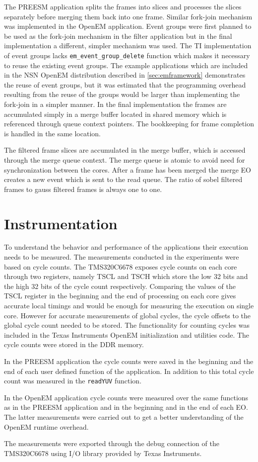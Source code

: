 The PREESM application splits the frames into slices and processes the slices
separately before merging them back into one frame. Similar fork-join mechanism
was implemented in the OpenEM application. Event groups were first planned to be
used as the fork-join mechanism in the filter application but in the final
implementation a different, simpler mechanism was used. The TI implementation of
event groups lacks \texttt{em\_event\_group\_delete} function which makes it
necessary to reuse the existing event groups. The example applications which are
included in the NSN OpenEM distribution described in \ref{sec:emframework}
demonstrates the reuse of event groups, but it was estimated that the
programming overhead resulting from the reuse of the groups would be larger than
implementing the fork-join in a simpler manner. In the final implementation the
frames are accumulated simply in a merge buffer located in shared memory which
is referenced through queue context pointers. The bookkeeping for frame
completion is handled in the same location.

The filtered frame slices are accumulated in the merge buffer, which is accessed
through the merge queue context. The merge queue is atomic to avoid need for
synchronization between the cores. After a frame has been merged the merge EO
creates a new event which is sent to the read queue. The ratio of sobel filtered
frames to gauss filtered frames is always one to one.

\section{Instrumentation}
\label{sec:instrumentation}
To understand the behavior and performance of the applications their execution
needs to be measured. The measurements conducted in the experiments were based
on cycle counts. The TMS320C6678 exposes cycle counts on each core through two
registers, namely TSCL and TSCH which store the low 32 bits and the high 32 bits
of the cycle count respectively. Comparing the values of the TSCL register in
the beginning and the end of processing on each core gives accurate local
timings and would be enough for measuring the execution on single core. However
for accurate measurements of global cycles, the cycle offsets to the global
cycle count needed to be stored. The functionality for counting cycles was
included in the Texas Instruments OpenEM initialization and utilities code. The
cycle counts were stored in the DDR memory.

In the PREESM application the cycle counts were saved in the beginning and the
end of each user defined function of the application. In addition to this total
cycle count was measured in the \texttt{readYUV} function.

In the OpenEM application cycle counts were measured over the same functions as
in the PREESM application and in the beginning and in the end of each EO. The
latter measurements were carried out to get a better understanding of the OpenEM
runtime overhead.

The measurements were exported through the debug connection of the TMS320C6678
using I/O library provided by Texas Instruments.
